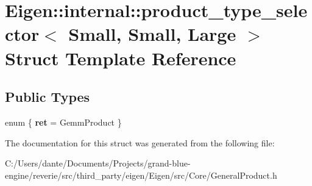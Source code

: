 \hypertarget{struct_eigen_1_1internal_1_1product__type__selector_3_01_small_00_01_small_00_01_large_01_4}{}\section{Eigen\+::internal\+::product\+\_\+type\+\_\+selector$<$ Small, Small, Large $>$ Struct Template Reference}
\label{struct_eigen_1_1internal_1_1product__type__selector_3_01_small_00_01_small_00_01_large_01_4}
\subsection*{Public Types}
\begin{DoxyCompactItemize}
\item 
\mbox{\label{struct_eigen_1_1internal_1_1product__type__selector_3_01_small_00_01_small_00_01_large_01_4_aa9a381051f17958cda92f6cb797208a1}} 
enum \{ {\bfseries ret} = Gemm\+Product
 \}
\end{DoxyCompactItemize}


The documentation for this struct was generated from the following file\+:\begin{DoxyCompactItemize}
\item 
C\+:/\+Users/dante/\+Documents/\+Projects/grand-\/blue-\/engine/reverie/src/third\+\_\+party/eigen/\+Eigen/src/\+Core/General\+Product.\+h\end{DoxyCompactItemize}
